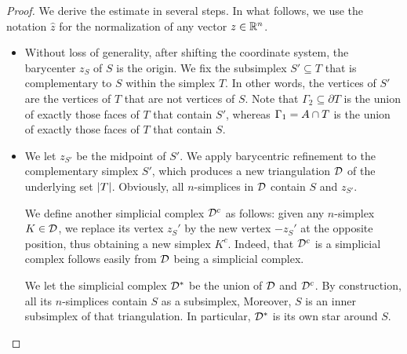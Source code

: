 \documentclass[10pt,a4paper]{article}
\begin{document}
\begin{proof}
    We derive the estimate in several steps. 
    In what follows, we use the notation $\hat z$ for the normalization of any vector $z \in {\mathbb R}^{n}$.
    \begin{itemize}
        \item 
        Without loss of generality, after shifting the coordinate system, the barycenter $z_{S}$ of $S$ is the origin. 
        We fix the subsimplex $S' \subseteq T$ that is complementary to $S$ within the simplex $T$. 
        In other words, the vertices of $S'$ are the vertices of $T$ that are not vertices of $S$. 
        Note that ${\Gamma_2} \subseteq \partial T$ is the union of exactly those faces of $T$ that contain $S'$,
        whereas ${\Gamma_1} = A \cap T$ is the union of exactly those faces of $T$ that contain $S$. 
        
        
        \item 
        We let $z_{S'}$ be the midpoint of $S'$. 
        We apply barycentric refinement to the complementary simplex $S'$, which produces a new triangulation ${\mathcal D}$ of the underlying set $\left| T \right|$. 
        Obviously, all $n$-simplices in ${\mathcal D}$ contain $S$ and $z_{S'}$.
        
        We define another simplicial complex ${\mathcal D}^c$ as follows:
        given any $n$-simplex $K \in {\mathcal D}$, 
        we replace its vertex $z_{S}'$ by the new vertex $-z_{S}'$ at the opposite position,
        thus obtaining a new simplex $K^{c}$. 
        Indeed, that ${\mathcal D}^c$ is a simplicial complex follows easily from ${\mathcal D}$ being a simplicial complex. 
        
        We let the simplicial complex ${\mathcal D}^\ast$ be the union of ${\mathcal D}$ and ${\mathcal D}^c$. 
        By construction, all its $n$-simplices contain $S$ as a subsimplex,
        Moreover, $S$ is an inner subsimplex of that triangulation. 
        In particular, ${\mathcal D}^\ast$ is its own star around $S$.
        
        

\end{itemize}
\end{proof}
\end{document}
